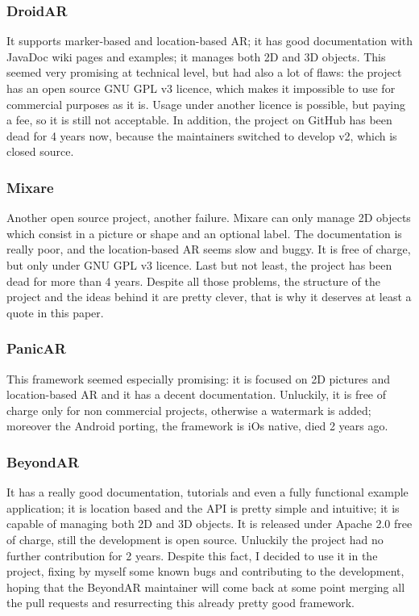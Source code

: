 			\subsubsection{DroidAR}
				
				It supports marker-based and location-based AR; it has good documentation with JavaDoc wiki pages and examples; it manages both 2D and 3D objects.
				This seemed very promising at technical level, but had also a lot of flaws: the project has an open source GNU GPL v3 licence, which makes it impossible to use for commercial purposes as it is. Usage under another licence is possible, but paying a fee, so it is still not acceptable.
				In addition, the project on GitHub has been dead for 4 years now, because the maintainers switched to develop v2, which is closed source.
			
			\subsubsection{Mixare}
			
				Another open source project, another failure. Mixare can only manage 2D objects which consist in a picture or shape and an optional label. The documentation is really poor, and the location-based AR seems slow and buggy. It is free of charge, but only under GNU GPL v3 licence. Last but not least, the project has been dead for more than 4 years.
				Despite all those problems, the structure of the project and the ideas behind it are pretty clever, that is why it deserves at least a quote in this paper.
			
			\subsubsection{PanicAR}
			
				This framework seemed especially promising: it is focused on 2D pictures and location-based AR and it has a decent documentation.
				Unluckily, it is free of charge only for non commercial projects, otherwise a watermark is added; moreover the Android porting, the framework is iOs native, died 2 years ago.
			
			\subsubsection{BeyondAR}
			
				It has a really good documentation, tutorials and even a fully functional example application; it is location based and the API is pretty simple and intuitive; it is capable of managing both 2D and 3D objects. It is released under Apache 2.0 free of charge, still the development is open source.
				Unluckily the project had no further contribution for 2 years. Despite this fact, I decided to use it in the project, fixing by myself some known bugs and contributing to the development, hoping that the BeyondAR maintainer will come back at some point merging all the pull requests and resurrecting this already pretty good framework.
		

